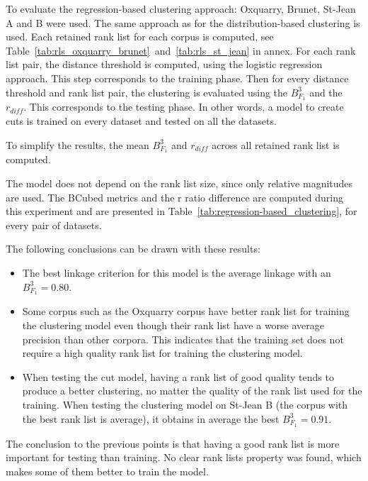 To evaluate the regression-based clustering approach: Oxquarry, Brunet, St-Jean A and B were used.
The same approach as for the distribution-based clustering is used.
Each retained rank list for each corpus is computed, see Table~\ref{tab:rls_oxquarry_brunet}~and~\ref{tab:rls_st_jean} in annex.
For each rank list pair, the distance threshold is computed, using the logistic regression approach.
This step corresponds to the training phase.
Then for every distance threshold and rank list pair, the clustering is evaluated using the $B^3_{F_1}$ and the $r_{diff}$.
This corresponds to the testing phase.
In other words, a model to create cuts is trained on every dataset and tested on all the datasets.

To simplify the results, the mean $B^3_{F_1}$ and $r_{diff}$ across all retained rank list is computed.

The model does not depend on the rank list size, since only relative magnitudes are used.
The BCubed metrics and the r ratio difference are computed during this experiment and are presented in Table~\ref{tab:regression-based_clustering}, for every pair of datasets.

The following conclusions can be drawn with these results:
\begin{itemize}
  \item
  The best linkage criterion for this model is the average linkage with an $B^3_{F_1} = 0.80$.
  \item
  Some corpus such as the Oxquarry corpus have better rank list for training the clustering model even though their rank list have a worse average precision than other corpora.
  This indicates that the training set does not require a high quality rank list for training the clustering model.
  \item
  When testing the cut model, having a rank list of good quality tends to produce a better clustering, no matter the quality of the rank list used for the training.
  When testing the clustering model on St-Jean B (the corpus with the best rank list is average), it obtains in average the best $B^3_{F_1} = 0.91$.
\end{itemize}

The conclusion to the previous points is that having a good rank list is more important for testing than training.
No clear rank lists property was found, which makes some of them better to train the model.

